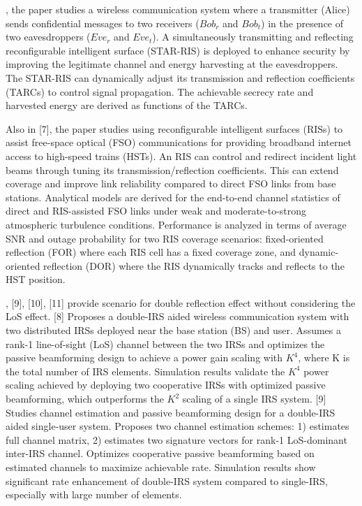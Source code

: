 \documentclass{article}
\begin{document}
\par [6], the paper studies a wireless communication system where a transmitter (Alice) sends confidential messages to two receivers ($Bob_r$ and $Bob_t$) in the presence of two eavesdroppers ($Eve_r$ and $Eve_t$). A simultaneously transmitting and reflecting reconfigurable intelligent surface (STAR-RIS) is deployed to enhance security by improving the legitimate channel and energy harvesting at the eavesdroppers. The STAR-RIS can dynamically adjust its transmission and reflection coefficients (TARCs) to control signal propagation. The achievable secrecy rate and harvested energy are derived as functions of the TARCs.
\par Also in [7], the paper studies using reconfigurable intelligent surfaces (RISs) to assist free-space optical (FSO) communications for providing broadband internet access to high-speed trains (HSTs).
An RIS can control and redirect incident light beams through tuning its transmission/reflection coefficients. This can extend coverage and improve link reliability compared to direct FSO links from base stations. Analytical models are derived for the end-to-end channel statistics of direct and RIS-assisted FSO links under weak and moderate-to-strong atmospheric turbulence conditions. Performance is analyzed in terms of average SNR and outage probability for two RIS coverage scenarios: fixed-oriented reflection (FOR) where each RIS cell has a fixed coverage zone, and dynamic-oriented reflection (DOR) where the RIS dynamically tracks and reflects to the HST position.
\par [8], [9], [10], [11]  provide scenario for double reflection effect without considering the LoS effect.
[8] Proposes a double-IRS aided wireless communication system with two distributed IRSs deployed near the base station (BS) and user.
Assumes a rank-1 line-of-sight (LoS) channel between the two IRSs and optimizes the passive beamforming design to achieve a power gain scaling with $K^4$, where K is the total number of IRS elements.
Simulation results validate the $K^4$ power scaling achieved by deploying two cooperative IRSs with optimized passive beamforming, which outperforms the $K^2$ scaling of a single IRS system. [9] Studies channel estimation and passive beamforming design for a double-IRS aided single-user system. Proposes two channel estimation schemes: 1) estimates full channel matrix, 2) estimates two signature vectors for rank-1 LoS-dominant inter-IRS channel. Optimizes cooperative passive beamforming based on estimated channels to maximize achievable rate. Simulation results show significant rate enhancement of double-IRS system compared to single-IRS, especially with large number of elements.
\end{document}
